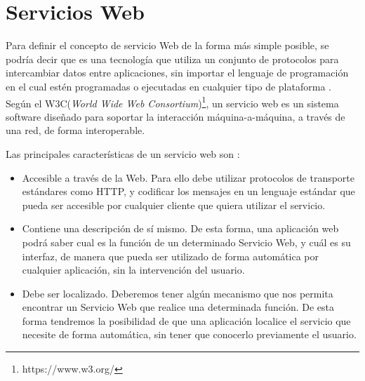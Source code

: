 \section{Servicios Web}
\label{cap:sec:serviciosweb}

Para definir el concepto de servicio Web de la forma más simple posible, se podría decir que es una tecnología que utiliza un conjunto de protocolos para intercambiar datos entre aplicaciones, sin importar el lenguaje de programación en el cual estén programadas o ejecutadas en cualquier tipo de plataforma \citep{wiki:w3c2004}. Según el W3C(\textit{World Wide Web Consortium})\footnote{https://www.w3.org/}, un servicio web es un sistema software diseñado para soportar la interacción máquina-a-máquina, a través de una red, de forma interoperable.




Las principales características de un servicio web son \citep{TorresJoaquin2017SC}:



\begin{itemize}
	\item Accesible a través de la Web. Para ello debe utilizar protocolos de transporte estándares como HTTP, y codificar los mensajes en un lenguaje estándar que pueda ser accesible por cualquier cliente que quiera utilizar el servicio. 
	\item Contiene una descripción de sí mismo. De esta forma, una aplicación web podrá saber cual es la función de un determinado Servicio Web, y cuál es su interfaz, de manera que pueda ser utilizado de forma automática por cualquier aplicación, sin la intervención del usuario.
	\item Debe ser localizado. Deberemos tener algún mecanismo que nos permita encontrar un Servicio Web que realice una determinada función. De esta forma tendremos la posibilidad de que una aplicación localice el servicio que necesite de forma automática, sin tener que conocerlo previamente el usuario.
\end{itemize}

